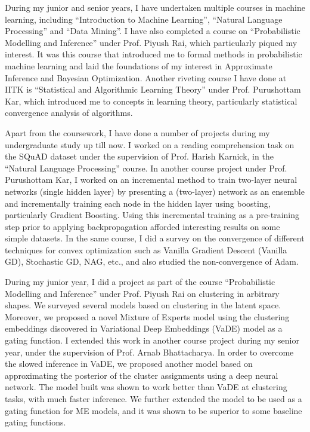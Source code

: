 \documentclass[11pt, letter]{resume}
\begin{document}
\begin{cvletter}
	During my junior and senior years, I have undertaken multiple courses in
	machine learning, including “Introduction to Machine Learning”, “Natural
	Language Processing” and “Data Mining”. I have also completed a course on
	“Probabilistic Modelling and Inference” under Prof. Piyush Rai, which
	particularly piqued my interest.  It was this course that introduced me to
	formal methods in probabilistic machine learning and laid the foundations
	of my interest in Approximate Inference and Bayesian Optimization. Another
	riveting course I have done at IITK is “Statistical and Algorithmic
	Learning Theory” under Prof. Purushottam Kar, which introduced me to
	concepts in learning theory, particularly statistical convergence analysis
	of algorithms.

	Apart from the coursework, I have done a number of projects during my
	undergraduate study up till now. I worked on a reading comprehension task
	on the SQuAD dataset under the supervision of Prof. Harish Karnick, in the
	“Natural Language Processing” course. In another course project under Prof.
	Purushottam Kar, I worked on an incremental method to train two-layer
	neural networks (single hidden layer) by presenting a (two-layer) network
	as an ensemble and incrementally training each node in the hidden layer
	using boosting, particularly Gradient Boosting. Using this incremental
	training as a pre-training step prior to applying backpropagation afforded
	interesting results on some simple datasets. In the same course, I did a
	survey on the convergence of different techniques for convex optimization
	such as Vanilla Gradient Descent (Vanilla GD), Stochastic GD, NAG, etc.,
	and also studied the non-convergence of Adam.

	During my junior year, I did a project as part of the course “Probabilistic
	Modelling and Inference” under Prof. Piyush Rai on clustering in arbitrary
	shapes. We surveyed several models based on clustering in the latent space.
	Moreover, we proposed a novel Mixture of Experts model using the clustering
	embeddings discovered in Variational Deep Embeddings (VaDE) model as a
	gating function. I extended this work in another course project during my
	senior year, under the supervision of Prof. Arnab Bhattacharya. In order to
	overcome the slowed inference in VaDE, we proposed another model based on
	approximating the posterior of the cluster assignments using a deep neural
	network. The model built was shown to work better than VaDE at clustering
	tasks, with much faster inference. We further extended the model to be used
	as a gating function for ME models, and it was shown to be superior to some
	baseline gating functions.


\end{cvletter}
\end{document}
